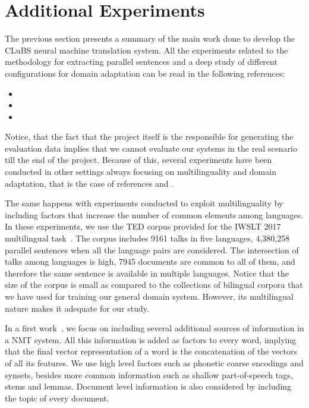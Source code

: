 \documentclass[a4paper,11pt]{article}
\begin{document}
\section{Additional Experiments}
\label{s:moreExperiments}

The previous section presents a summary of the main work done to develop the CLuBS neural machine translation system. All the experiments related to the methodology for extracting parallel sentences and a deep study of different configurations for domain adaptation can be read in the following references:
\begin{itemize}
 \item[\cite{EspanaBarron:2017}] 
 \item[\cite{espanaEtAl:2017}] 
 \item[\cite{tesisAdam}] 
\end{itemize}


Notice, that the fact that the project itself is the responsible for generating the evaluation data implies that we cannot evaluate our systems in the real scenario till the end of the project. Because of this, several experiments have been conducted in other settings always focusing on multilinguality and domain adaptation, that is the case of references \cite{EspanaBarron:2017} and \cite{espanaEtAl:2017}.  

The same happens with experiments conducted to exploit multilinguality by including factors that increase the number of common elements among languages. In these experiments, we use the TED corpus provided for the IWSLT 2017 multilingual task~\cite{iwslt-overview:2017}. The corpus includes 9161 talks in five languages, 4,380,258 parallel sentences when all the language pairs are considered. The intersection of talks among languages is high, 7945 documents are common to all of them, and therefore the same sentence is available in multiple languages.  Notice that the size of the corpus is small as compared to the collections of bilingual corpora that we have used for training our general domain system. However, its multilingual nature makes it adequate for our study.

In a first work~\cite{espanaVanGenabith:IWSLT:2017}, we focus on including several additional sources of information in a NMT system. All this information is added as factors to every word, implying that the final vector representation of a word is the concatenation of the vectors of all its features. We use high level factors such as phonetic coarse encodings and synsets, besides more common information such as shallow part-of-speech tags, stems and lemmas. Document level information is also considered by including the topic of every document. 
\end{document}
